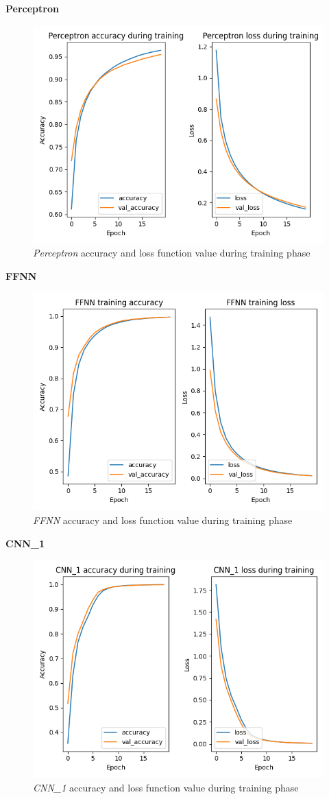 \textbf{Perceptron}

\begin{figure}[h!]
\centering
\includegraphics[width=0.66\linewidth]{../images/perceptron_training_accuracy.png}
\caption{\emph{Perceptron} accuracy and loss function value during training phase}
\end{figure}

\textbf{FFNN}

\begin{figure}[h!]
\centering
\includegraphics[width=0.66\linewidth]{../images/ffnn_training_accuracy.png}
\caption{\emph{FFNN} accuracy and loss function value during training phase}
\end{figure}

\textbf{CNN\_1}

\begin{figure}[h!]
\centering
\includegraphics[width=0.68\linewidth]{../images/cnn_1_training_accuracy.png}
\caption{\emph{CNN\_1} accuracy and loss function value during training phase}
\end{figure}

